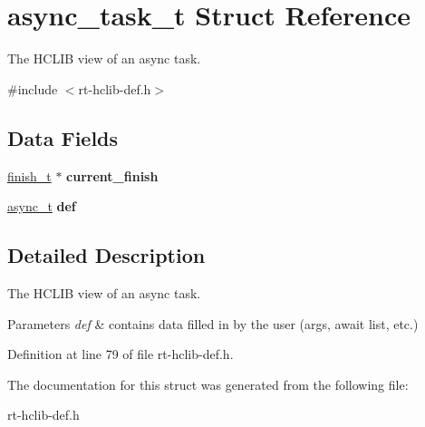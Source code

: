 \hypertarget{structasync__task__t}{\section{async\-\_\-task\-\_\-t Struct Reference}
\label{structasync__task__t}
}


The H\-C\-L\-I\-B view of an async task.  




{\ttfamily \#include $<$rt-\/hclib-\/def.\-h$>$}

\subsection*{Data Fields}
\begin{DoxyCompactItemize}
\item 
\hypertarget{structasync__task__t_a0344b7c500d12433df8e1c4ae2830965}{\hyperlink{structfinish__t}{finish\-\_\-t} $\ast$ {\bfseries current\-\_\-finish}}\label{structasync__task__t_a0344b7c500d12433df8e1c4ae2830965}

\item 
\hypertarget{structasync__task__t_a30f2eac8cb928deaaac0b0de7d5f8d32}{\hyperlink{structasync__t}{async\-\_\-t} {\bfseries def}}\label{structasync__task__t_a30f2eac8cb928deaaac0b0de7d5f8d32}

\end{DoxyCompactItemize}


\subsection{Detailed Description}
The H\-C\-L\-I\-B view of an async task. 


\begin{DoxyParams}{Parameters}
{\em def} & contains data filled in by the user (args, await list, etc.) \\
\hline
\end{DoxyParams}


Definition at line 79 of file rt-\/hclib-\/def.\-h.



The documentation for this struct was generated from the following file\-:\begin{DoxyCompactItemize}
\item 
rt-\/hclib-\/def.\-h\end{DoxyCompactItemize}
